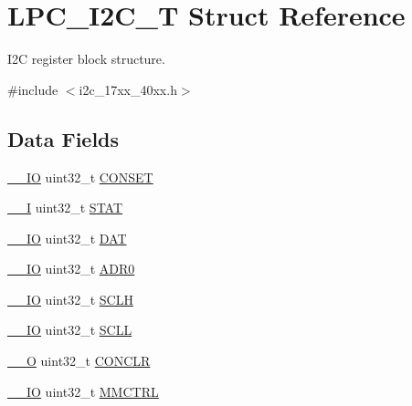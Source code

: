 \hypertarget{structLPC__I2C__T}{\section{L\-P\-C\-\_\-\-I2\-C\-\_\-\-T Struct Reference}
\label{structLPC__I2C__T}
}


I2\-C register block structure.  




{\ttfamily \#include $<$i2c\-\_\-17xx\-\_\-40xx.\-h$>$}

\subsection*{Data Fields}
\begin{DoxyCompactItemize}
\item 
\hyperlink{core__cm3_8h_aec43007d9998a0a0e01faede4133d6be}{\-\_\-\-\_\-\-I\-O} uint32\-\_\-t \hyperlink{structLPC__I2C__T_a98ed6d816b3c7e00a29b32956fe5fa2d}{C\-O\-N\-S\-E\-T}
\item 
\hyperlink{core__cm3_8h_af63697ed9952cc71e1225efe205f6cd3}{\-\_\-\-\_\-\-I} uint32\-\_\-t \hyperlink{structLPC__I2C__T_ae806722ff38a93680338e5607d96156d}{S\-T\-A\-T}
\item 
\hyperlink{core__cm3_8h_aec43007d9998a0a0e01faede4133d6be}{\-\_\-\-\_\-\-I\-O} uint32\-\_\-t \hyperlink{structLPC__I2C__T_ab3babd27c9d202c1fefce13d5498d473}{D\-A\-T}
\item 
\hyperlink{core__cm3_8h_aec43007d9998a0a0e01faede4133d6be}{\-\_\-\-\_\-\-I\-O} uint32\-\_\-t \hyperlink{structLPC__I2C__T_a900e0819e3f450e08a3566caf6f18851}{A\-D\-R0}
\item 
\hyperlink{core__cm3_8h_aec43007d9998a0a0e01faede4133d6be}{\-\_\-\-\_\-\-I\-O} uint32\-\_\-t \hyperlink{structLPC__I2C__T_a73be20e257e178ea0deafd0057cc7900}{S\-C\-L\-H}
\item 
\hyperlink{core__cm3_8h_aec43007d9998a0a0e01faede4133d6be}{\-\_\-\-\_\-\-I\-O} uint32\-\_\-t \hyperlink{structLPC__I2C__T_a1cd0d0f95f90d6e6c3380f112144085b}{S\-C\-L\-L}
\item 
\hyperlink{core__cm3_8h_a7e25d9380f9ef903923964322e71f2f6}{\-\_\-\-\_\-\-O} uint32\-\_\-t \hyperlink{structLPC__I2C__T_a091c12dd25fb7db692339da933c8b523}{C\-O\-N\-C\-L\-R}
\item 
\hyperlink{core__cm3_8h_aec43007d9998a0a0e01faede4133d6be}{\-\_\-\-\_\-\-I\-O} uint32\-\_\-t \hyperlink{structLPC__I2C__T_ace2d21c2a5042f1355f98b2e687ae8c1}{M\-M\-C\-T\-R\-L}
\item 

\end{DoxyCompactItemize}
